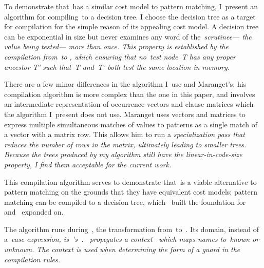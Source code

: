 \documentclass[manuscript,screen, 12pt, nonacm]{acmart}
\begin{document}
    To demonstrate that~\VMinus has a similar cost model to pattern matching,
    I~present an algorithm for compiling~\VMinus to a decision tree. I choose
    the decision tree as a target for compilation for the simple reason of its
    appealing cost model. A decision tree can be exponential in size but never
    examines any word of the~\it{scrutinee}--- the value being tested--- more
    than once. This property is established by the compilation from~\VMinus to
    \D, which ensuring that no~\it{test} node~\it{T} has any proper ancestor
    \it{T'} such that~\it{T} and~\it{T'} both test the same location in memory.   

    There are a few minor differences in the algorithm I~use and Maranget's: his
    compilation algorithm is more complex than the one in this paper, and
    involves an intermediate representation of occurrence vectors and clause
    matrices which the algorithm I~present does not use. Maranget uses vectors
    and matrices to express multiple simultaneous matches of values to patterns
    as a single match of a vector with a matrix row. This allows him to run a
    \it{specialization} pass that reduces the number of rows in the matrix,
    ultimately leading to smaller trees. Because the trees produced by my
    algorithm still have the linear-in-code-size property, I find them
    acceptable for the current work. 

    This compilation algorithm serves to demonstrate that~\VMinus is a viable
    alternative to pattern matching on the grounds that they have equivalent
    cost models: pattern matching can be compiled to a decision tree,
    which~\citet{macqueen1985tree} built the foundation for and~\citet{maranget}
    expanded on. 

    The algorithm runs during~\DTran, the transformation from~\VMinus to~\D. Its
    domain, instead of a~\it{case} expression, is~\VMinus's~\iffibf.
    \DTran~propegates a context~\ctx\; which maps names to~\it{known} or
    \it{unknown}. The context is used when determining the form of a guard in
    the compilation rules. 
       


\end{document}
